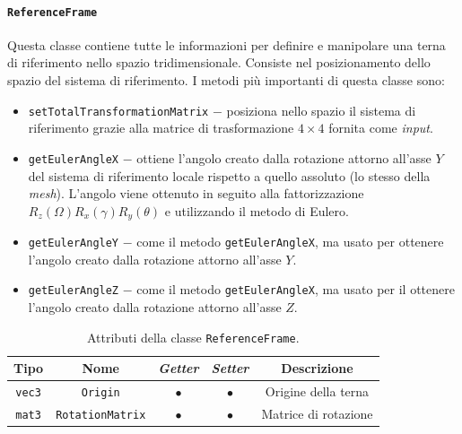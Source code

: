 \paragraph{\texttt{ReferenceFrame}}
Questa classe contiene tutte le informazioni per definire e manipolare una terna di riferimento nello spazio tridimensionale. Consiste nel posizionamento dello spazio del sistema di riferimento. I metodi più importanti di questa classe sono:
\begin{itemize}
	\item \texttt{setTotalTransformationMatrix} $-$ posiziona nello spazio il sistema di riferimento grazie alla matrice di trasformazione $4\times4$ fornita come \textit{input}.
	\item \texttt{getEulerAngleX} $-$ ottiene l'angolo creato dalla rotazione attorno all'asse $Y$ del sistema di riferimento locale rispetto a quello assoluto (lo stesso della \textit{mesh}). L'angolo viene ottenuto in seguito alla fattorizzazione $R_z(\Omega) R_x(\gamma) R_y(\theta)$ e utilizzando il metodo di Eulero.
	\item \texttt{getEulerAngleY} $-$ come il metodo \texttt{getEulerAngleX}, ma usato per ottenere l'angolo creato dalla rotazione attorno all'asse $Y$.
	\item \texttt{getEulerAngleZ} $-$ come il metodo \texttt{getEulerAngleX}, ma usato per il ottenere l'angolo creato dalla rotazione attorno all'asse $Z$.
\end{itemize}
\begin{table}[h!]
	\centering
	\begin{tabular}{|c|c|c|c|c|}
		\hline 
		\textbf{Tipo} & \textbf{Nome} & \textit{\textbf{Getter}} & \textit{\textbf{Setter}} & \textbf{Descrizione} \\ \hline 
		\texttt{vec3} & \texttt{Origin} & $\bullet$ & $\bullet$ & Origine della terna \\ \hline 
		\texttt{mat3} & \texttt{RotationMatrix} & $\bullet$ & $\bullet$ & Matrice di rotazione \\ \hline
	\end{tabular}
	\caption{Attributi della classe \texttt{ReferenceFrame}.}
	\label{}
\end{table}
%
